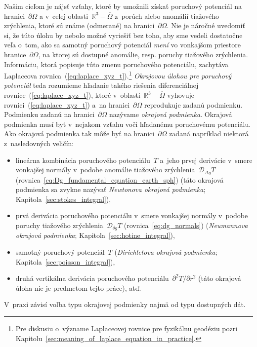 \documentclass[a4paper, 12pt]{book}
\newcommand{\DIFF}{\mathcal D}
\begin{document}
Našim cieľom je nájsť vzťahy, ktoré by umožnili získať poruchový potenciál na 
hranici~$\partial \Omega$ a v~celej oblasti~$\mathbb{R}^3 - \overline{\Omega}$ 
z~porúch alebo anomálií tiažového zrýchlenia, ktoré sú známe (odmerané) na 
hranici~$\partial \Omega$.  Nie je náročné uvedomiť si, že túto úlohu by nebolo 
možné vyriešiť bez toho, aby sme vedeli dostatočne veľa o~tom, ako sa samotný 
poruchový potenciál \emph{mení} vo vonkajšom priestore 
hranice~$\partial\Omega$, na ktorej sú dostupné anomálie, resp. poruchy 
tiažového zrýchlenia.  Informáciu, ktorá popisuje túto zmenu poruchového 
potenciálu, zachytáva Laplaceova rovnica~(\ref{eq:laplace_xyz_t}).\footnote{Pre 
diskusiu o~význame Laplaceovej rovnice pre fyzikálnu geodéziu pozri 
Kapitolu~\ref{sec:meaning_of_laplace_equation_in_practice}.}  \emph{Okrajovou 
úlohou pre poruchový potenciál} teda rozumieme hľadanie takého riešenia 
diferenciálnej rovnice~(\ref{eq:laplace_xyz_t}), ktoré v~oblasti~$\mathbb{R}^3 
- \overline\Omega$ vyhovuje rovnici~(\ref{eq:laplace_xyz_t}) a~na 
hranici~$\partial \Omega$ reprodukuje zadanú podmienku.  Podmienku zadanú na 
hranici~$\partial \Omega$ nazývame \emph{okrajová podmienka}.  Okrajová 
podmienka musí byť v~nejakom vzťahu voči hľadanému poruchovému potenciálu.  Ako 
okrajová podmienka tak môže byť na hranici~$\partial \Omega$ zadaná napríklad 
niektorá z~nasledovných veličín:
%
\begin{itemize}
\item lineárna kombinácia poruchového potenciálu~$T$ a~jeho prvej derivácie 
v~smere vonkajšej normály v~podobe anomálie tiažového zrýchlenia~$\DIFF_{\Delta 
g}T$ (rovnica~\ref{eq:Dg_fundamental_equation_earth_sph}) (táto okrajová 
podmienka sa zvykne nazývať \emph{Newtonova okrajová podmienka}; 
Kapitola~\ref{sec:stokes_integral}),
%
\item prvá derivácia poruchového potenciálu v~smere vonkajšej normály v~podobe 
poruchy tiažového zrýchlenia~$\DIFF_{\delta g} T$ (rovnica~\ref{eq:dg_normals}) 
(\emph{Neumannova okrajová podmienka}; Kapitola~\ref{sec:hotine_integral}),
%
\item samotný poruchový potenciál~$T$ (\emph{Dirichletova okrajová podmienka}; 
Kapitola~\ref{sec:poisson_integral}),
%
\item druhá vertikálna derivácia poruchového potenciálu~$\partial^2 
T / \partial r^2$ (táto okrajová úloha nie je predmetom tejto práce), atď.
\end{itemize}
%
V~praxi závisí voľba typu okrajovej podmienky najmä od typu dostupných dát.
\end{document}
